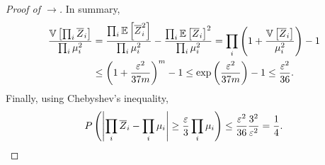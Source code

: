 \begin{proof}[Proof of $\rightarrow$]
    In summary,
    \begin{align*}
        \frac{\mathbb{V}\left[\prod_i \overline{Z}_i\right]}{\prod_i \mu_i^2} & = \frac{\prod_i \mathbb{E}\left[\overline{Z}_i^2\right]}{\prod_i \mu_i^2} - \frac{\prod_i \mathbb{E}\left[\overline{Z}_i\right]^2}{\prod_i \mu_i^2} = \prod_i \left(1 + \frac{\mathbb{V}\left[\overline Z_i\right]}{\mu_i^2}   \right) - 1 \\
                                                                  & \leq \left(1  + \frac{\varepsilon^2}{37m}  \right)^m - 1 \leq \exp\left(\frac{\varepsilon^2}{37m}\right) - 1 \leq \frac{\varepsilon^2}{36}.
    \end{align*}
    Finally, using Chebyshev's inequality,
    \begin{align*}
        P\left(\left|\prod_i \overline Z_i - \prod_i \mu_i \right| \geq \frac{\varepsilon}{3}\prod_i \mu_i\right) \leq \frac{\varepsilon^2}{36}\frac{3^2}{\varepsilon^2} = \frac{1}{4}.
    \end{align*}
\end{proof}